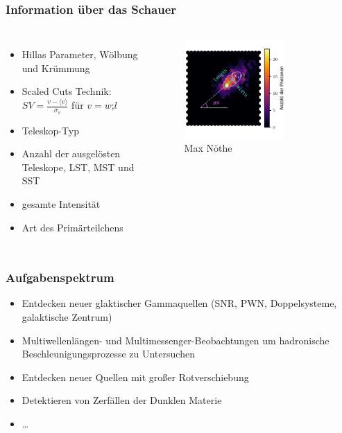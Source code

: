 \documentclass[aspectratio=1610, professionalfonts, 9pt]{beamer}
\begin{document}
  \begin{frame}
    \frametitle{Information über das Schauer}
    \begin{columns}
        \begin{itemize}
          \item Hillas Parameter, Wölbung und Krümmung
          \item Scaled Cuts Technik: $SV = \frac{v- \langle v \rangle}{\sigma_v}$ für $v=w\text{;}l$~\cite[104]{SV}
          \item Teleskop-Typ
          \item Anzahl der ausgelösten Teleskope, LST, MST und SST
          \item gesamte Intensität
          \item Art des Primärteilchens
        \end{itemize}
        \begin{figure}
          \includegraphics[width=0.7\textwidth]{pictures/hillas_2.pdf}
          \caption{Max Nöthe}
          \label{abb:Hillas}
        \end{figure}
    \end{columns}
  \end{frame}

  \begin{frame}
    \frametitle{Aufgabenspektrum}
    \begin{itemize}
      \item Entdecken neuer glaktischer Gammaquellen (SNR, PWN, Doppelsysteme, galaktische Zentrum)
      \item Multiwellenlängen- und Multimessenger-Beobachtungen um hadronische Beschleunigungsprozesse zu Untersuchen
      \item Entdecken neuer Quellen mit großer Rotverschiebung
      \item Detektieren von Zerfällen der Dunklen Materie
      \item \dots
    \end{itemize}
  \end{frame}
\end{document}
